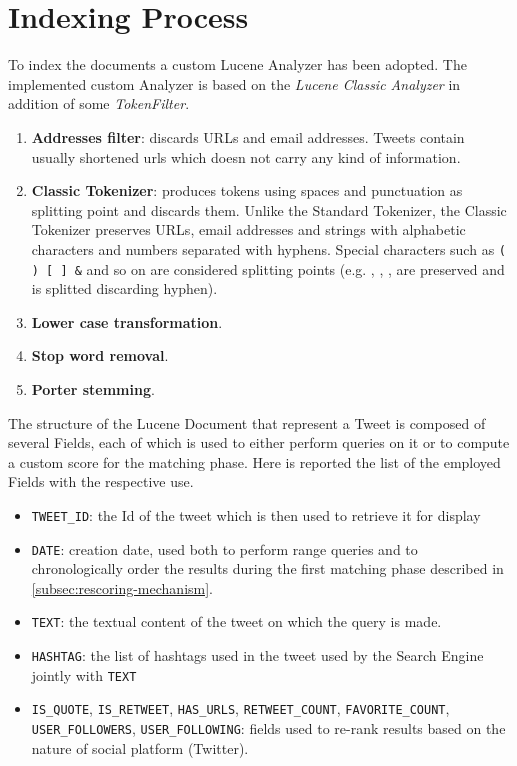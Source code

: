 \section{Indexing Process}
To index the documents a custom Lucene Analyzer has been adopted.
The implemented custom Analyzer is based on the \textit{Lucene Classic Analyzer} in addition of some \textit{TokenFilter}.

\begin{enumerate}
    \item \textbf{Addresses filter}: discards URLs and email addresses. Tweets contain usually shortened urls which doesn not carry any kind of information.
    \item \textbf{Classic Tokenizer}: produces tokens using spaces and 
    punctuation as splitting point and discards them.
    Unlike the Standard Tokenizer, the Classic Tokenizer preserves URLs, email addresses and strings with alphabetic characters and numbers separated with hyphens. Special characters such as \verb|( ) [ ] &| and so on are considered splitting points (e.g. , , ,  are preserved and  is splitted discarding hyphen).
    \item \textbf{Lower case transformation}.
    \item \textbf{Stop word removal}.
    \item \textbf{Porter stemming}.
\end{enumerate}

The structure of the Lucene Document that represent a Tweet is composed of several Fields, each of which is used to either perform queries on it or to compute a custom score for the matching phase. 
Here is reported the list of the employed Fields with the respective use.

\begin{itemize}
    \item \verb|TWEET_ID|: the Id of the tweet which is then used to retrieve it for display
    \item \verb|DATE|: creation date, used both to perform range queries and to chronologically order the results during the first matching phase described in \ref{subsec:rescoring-mechanism}.
    \item \verb|TEXT|: the textual content of the tweet on which the query is made.
    \item \verb|HASHTAG|: the list of hashtags used in the tweet used by the Search Engine jointly with \verb|TEXT|
    \item \verb|IS_QUOTE|, \verb|IS_RETWEET|, \verb|HAS_URLS|, \verb|RETWEET_COUNT|, \verb|FAVORITE_COUNT|, \verb|USER_FOLLOWERS|, \verb|USER_FOLLOWING|: fields used to re-rank results based on the nature of social platform (Twitter).
\end{itemize}